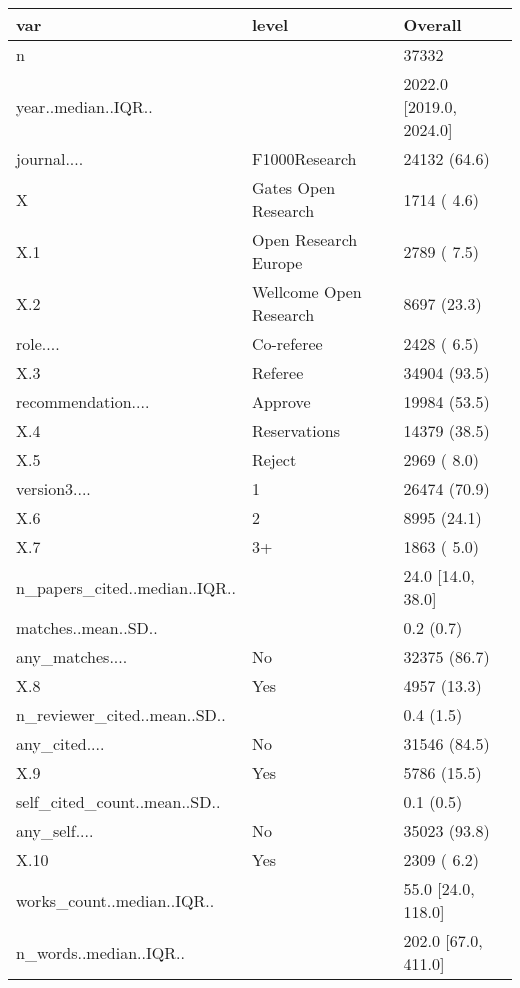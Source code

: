 \begin{table}[ht]
\centering
\begin{tabular}{lll}
 var & level & Overall \\ 
  \hline
n &  &  37332 \\ 
  year..median..IQR.. &  & 2022.0 [2019.0, 2024.0] \\ 
  journal.... & F1000Research &  24132 (64.6)  \\ 
  X & Gates Open Research &   1714 ( 4.6)  \\ 
  X.1 & Open Research Europe &   2789 ( 7.5)  \\ 
  X.2 & Wellcome Open Research &   8697 (23.3)  \\ 
  role.... & Co-referee &   2428 ( 6.5)  \\ 
  X.3 & Referee &  34904 (93.5)  \\ 
  recommendation.... & Approve &  19984 (53.5)  \\ 
  X.4 & Reservations &  14379 (38.5)  \\ 
  X.5 & Reject &   2969 ( 8.0)  \\ 
  version3.... & 1 &  26474 (70.9)  \\ 
  X.6 & 2 &   8995 (24.1)  \\ 
  X.7 & 3+ &   1863 ( 5.0)  \\ 
  n\_papers\_cited..median..IQR.. &  &   24.0 [14.0, 38.0] \\ 
  matches..mean..SD.. &  &    0.2 (0.7) \\ 
  any\_matches.... & No &  32375 (86.7)  \\ 
  X.8 & Yes &   4957 (13.3)  \\ 
  n\_reviewer\_cited..mean..SD.. &  &    0.4 (1.5) \\ 
  any\_cited.... & No &  31546 (84.5)  \\ 
  X.9 & Yes &   5786 (15.5)  \\ 
  self\_cited\_count..mean..SD.. &  &    0.1 (0.5) \\ 
  any\_self.... & No &  35023 (93.8)  \\ 
  X.10 & Yes &   2309 ( 6.2)  \\ 
  works\_count..median..IQR.. &  &   55.0 [24.0, 118.0] \\ 
  n\_words..median..IQR.. &  &  202.0 [67.0, 411.0] \\ 
  \end{tabular}
\end{table}
